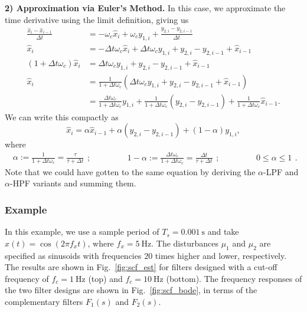 \documentclass[a4paper]{article}
\begin{document}
\textbf{2) Approximation via Euler's Method.} In this case, we approximate the time derivative using the limit definition, giving us
\begin{align*}
\frac{\hat{x}_i - \hat{x}_{i-1}}{\Delta t} &= -\omega_c\hat{x}_{i} + \omega_cy_{1,i} + \frac{y_{2,i} - y_{2,i-1}}{\Delta t} \\
\hat{x}_i &=  -\Delta t\omega_c\hat{x}_{i} + \Delta t \omega_c y_{1,i} + y_{2,i} - y_{2,i-1} + \hat{x}_{i-1} \\
(1+\Delta t\omega_c)\hat{x}_i &=  \Delta t \omega_c y_{1,i} + y_{2,i} - y_{2,i-1} + \hat{x}_{i-1} \\
\hat{x}_i &=  \frac{1}{1+\Delta t\omega_c} \left(\Delta t \omega_c y_{1,i} + y_{2,i} - y_{2,i-1} + \hat{x}_{i-1}\right) \\
          &=  \frac{\Delta t \omega_c}{1+\Delta t\omega_c} y_{1,i} + \frac{1}{1+\Delta t\omega_c}\left(y_{2,i} - y_{2,i-1}\right) + \frac{1}{1+\Delta t\omega_c} \hat{x}_{i-1}.
\end{align*}
We can write this compactly as
\begin{equation}
\hat{x}_i = \alpha\hat{x}_{i-1} + \alpha\left(y_{2,i} - y_{2,i-1}\right) + (1-\alpha)y_{1,i},
\end{equation}
where
\begin{equation*}
\begin{split}
\alpha := \frac{1}{1+\Delta t\omega_c} = \frac{\tau}{\tau+\Delta t}
\end{split};
\qquad\qquad
\begin{split}
1-\alpha := \frac{\Delta t\omega_c}{1+\Delta t\omega_c} = \frac{\Delta t}{\tau+\Delta t}
\end{split};
\qquad\qquad
\begin{split}
0\le\alpha\le1
\end{split}.
\end{equation*}
Note that we could have gotten to the same equation by deriving the $\alpha$-LPF and $\alpha$-HPF variants and summing them.

\subsubsection*{Example}
In this example, we use a sample period of $T_s=\SI{0.001}{\second}$ and take $x(t)=\cos(2\pi f_x t)$, where $f_x=\SI{5}{\Hz}$.
The disturbances $\mu_1$ and $\mu_2$ are specified as sinusoids with frequencies $20$ times higher and lower, respectively.
The results are shown in Fig.~\ref{fig:scf_est} for filters designed with a cut-off frequency of $f_c=\SI{1}{\Hz}$ (top) and $f_c=\SI{10}{\Hz}$ (bottom).
The frequency responses of the two filter designs are shown in Fig.~\ref{fig:scf_bode}, in terms of the complementary filters $F_1(s)$ and $F_2(s)$.
\end{document}
